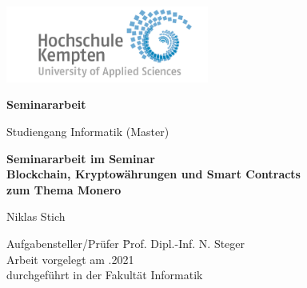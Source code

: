 \thispagestyle{empty}



\vspace*{-20mm}
\begin{flushright}
\includegraphics[width=0.5\textwidth]{Bilder/LogoHS.png}
\end{flushright}


\vspace*{2cm}

\begin{center}
{\Large \textbf{Seminararbeit}}\\ 

\vspace*{1cm}

{\large Studiengang Informatik (Master)\\[1mm]}

\vspace{1cm}

{\Large \bfseries Seminararbeit im Seminar \\ 
	Blockchain, Kryptowährungen und Smart Contracts\\
	zum Thema Monero\\}


\vspace{1.5cm}

{\large Niklas Stich}\\[40mm]

\end{center}

\vfill

\parbox{120mm}{
\begin{tabbing}
Aufgabensteller/Prüfer \hspace{.7cm} \= Prof. Dipl.-Inf. N. Steger\\
Arbeit vorgelegt am                  .2021\\
durchgeführt in der                  \> Fakultät Informatik\\[4mm]
\end{tabbing}
}

